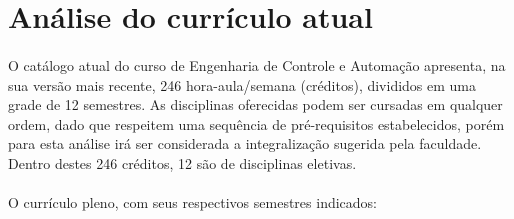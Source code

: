 \documentclass[12pt]{article} %
\begin{document}

\section{Análise do currículo atual}

\paragraph{}O catálogo atual do curso de Engenharia de Controle e Automação apresenta, na sua versão mais recente, 246 hora-aula/semana (créditos), divididos em uma grade de 12 semestres.  As disciplinas oferecidas podem ser cursadas em qualquer ordem, dado que respeitem uma sequência de pré-requisitos estabelecidos, porém para esta análise irá ser considerada a integralização sugerida pela faculdade. Dentro destes 246 créditos, 12 são de disciplinas eletivas.

\paragraph{} O currículo pleno, com seus respectivos semestres indicados:
\end{document}
